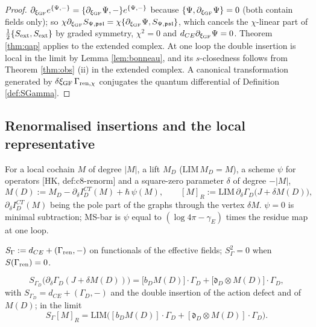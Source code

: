 \begin{proof}
$\partial_{\xi_{\rm GF}}e^{\{\Psi,-\}}=\{\partial_{\xi_{\rm GF}}\Psi,-\}e^{\{\Psi,-\}}$ because $\{\Psi,\partial_{\xi_{\rm GF}}\Psi\}=0$ (both contain fields only); so $\chi\partial_{\xi_{\rm GF}}S_{\Psi,\mathfrak{psl}}=\chi\{\partial_{\xi_{\rm GF}}\Psi,S_{\Psi,\mathfrak{psl}}\}$, which cancels the $\chi$-linear part of $\frac12\{S_{\rm ext},S_{\rm ext}\}$ by graded symmetry, $\chi^2=0$ and $d_{CE}\partial_{\xi_{\rm GF}}\Psi=0$. Theorem \ref{thm:qap} applies to the extended complex. At one loop the double insertion is local in the limit by Lemma \ref{lem:bonneau}, and its $s$-closedness follows from Theorem \ref{thm:obs} (ii) in the extended complex. A canonical transformation generated by $\delta\xi_{\rm GF}\,\Gamma_{{\rm ren},\chi}$ conjugates the quantum differential of Definition \ref{def:SGamma}.
\end{proof}

\subsection{Renormalised insertions and the local representative}

\begin{definition}
\label{def:insert}
For a local cochain $M$ of degree $|M|$, a lift $M_D$ ($\mathrm{LIM}\,M_D=M$), a scheme $\psi$ for operators [HK, def:c8-renorm] and a square-zero parameter $\delta$ of degree $-|M|$,
\[
M(D):=M_D-\partial_\delta I^{CT}_D(M)+\hbar\,\psi(M),\qquad [M]_R:=\mathrm{LIM}\,\partial_\delta\Gamma_D\big(J+\delta M(D)\big),
\]
$\partial_\delta I^{CT}_D(M)$ being the pole part of the graphs through the vertex $\delta M$. $\psi=0$ is minimal subtraction; MS-bar is $\psi$ equal to $(\log4\pi-\gamma_E)$ times the residue map at one loop.
\end{definition}

\begin{definition}
\label{def:SGamma}
$S_\Gamma:=d_{CE}+(\Gamma_{\rm ren},-)$ on functionals of the effective fields; $S_\Gamma^2=0$ when $S(\Gamma_{\rm ren})=0$.
\end{definition}

\begin{lemma}
\label{lem:qapO}
\[
S_{\Gamma_D}\big(\partial_\delta\Gamma_D(J+\delta M(D))\big)=\big[b_DM(D)\big]\cdot\Gamma_D+\big[\mathfrak d_D\otimes M(D)\big]\cdot\Gamma_D,
\]
with $S_{\Gamma_D}=d_{CE}+(\Gamma_D,-)$ and the double insertion of the action defect and of $M(D)$; in the limit
\[
S_\Gamma[M]_R=\mathrm{LIM}\Big([b_DM(D)]\cdot\Gamma_D+[\mathfrak d_D\otimes M(D)]\cdot\Gamma_D\Big).
\]
\end{lemma}

